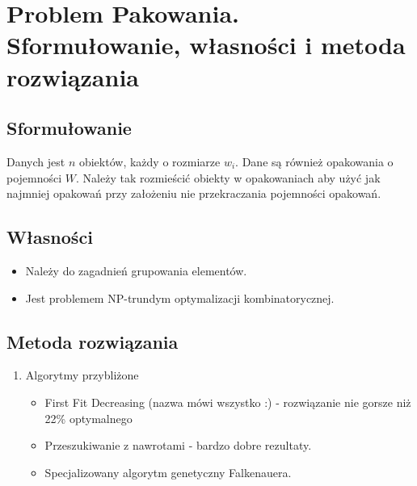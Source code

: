 \section{Problem Pakowania. Sformułowanie, własności i metoda rozwiązania}

	\subsection{Sformułowanie}
		Danych jest $n$ obiektów, każdy o rozmiarze $w_i$. Dane są również opakowania o pojemności $W$.
		Należy tak rozmieścić obiekty w opakowaniach aby użyć jak najmniej opakowań przy założeniu nie przekraczania
		pojemności opakowań.
		
	\subsection{Własności}
		\begin{itemize}
			\item Należy do zagadnień grupowania elementów.
			\item Jest problemem NP-trundym optymalizacji kombinatorycznej.
		\end{itemize}
		
	\subsection{Metoda rozwiązania}
	\begin{enumerate}
		\item Algorytmy przybliżone
			\begin{itemize}
				\item First Fit Decreasing (nazwa mówi wszystko :) - rozwiązanie nie gorsze niż 22\% optymalnego
				\item Przeszukiwanie z nawrotami - bardzo dobre rezultaty.
				\item Specjalizowany algorytm genetyczny Falkenauera.
			\end{itemize}
	\end{enumerate}